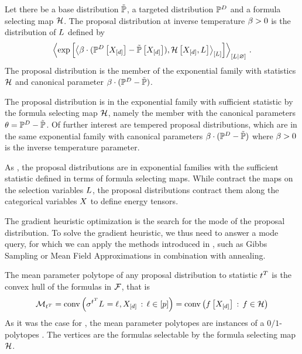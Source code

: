 \begin{definition}
    Let there be a base distribution $\tilde{\mathbb{P}}$, a targeted distribution $\mathbb{P}^{D}$ and a formula selecting map $\mathcal{H}$.
    The proposal distribution at inverse temperature $\beta>0$ is the distribution of $L$ defined by
    \begin{align*}
        \left\langle \mathrm{exp}\left[\left\langle \beta\cdot(\mathbb{P}^{D}\left[X_{[d]}\right]-\tilde{\mathbb{P}}\left[X_{[d]}\right]),\mathcal{H}\left[X_{[d]},L\right]\right\rangle_{\left[ L \right]}\right] \right\rangle_{\left[ L | \varnothing \right]} \, .
    \end{align*}
    The proposal distribution is the member of the exponential family with statistics $\mathcal{H}$ and canonical parameter $\beta\cdot(\mathbb{P}^{D}-\tilde{\mathbb{P}})$.
\end{definition}


The proposal distribution is in the exponential family with sufficient statistic by the formula selecting map $\mathcal{H}$, namely the member with the canonical parameters $\theta=\mathbb{P}^{D}-\tilde{\mathbb{P}}$.
Of further interest are tempered proposal distributions, which are in the same exponential family with canonical parameters $\beta\cdot(\mathbb{P}^{D}-\tilde{\mathbb{P}})$ where $\beta>0$ is the inverse temperature parameter.

As \MarkovLogicNetworks{}, the proposal distributions are in exponential families with the sufficient statistic defined in terms of formula selecting maps.
While \MarkovLogicNetworks{} contract the maps on the selection variables $L$, the proposal distributions contract them along the categorical variables $X$ to define energy tensors.

The gradient heuristic optimization  is the search for the mode of the proposal distribution.
To solve the gradient heuristic, we thus need to answer a mode query, for which we can apply the methods introduced in , such as Gibbs Sampling or Mean Field Approximations in combination with annealing.


The mean parameter polytope of any proposal distribution to statistic $t^T$ is the convex hull of the formulas in $\mathcal{F}$, that is
\begin{align*}
    \mathcal{M}_{t^T}
    = \mathrm{conv}\left(\sigma^{t^T}{L_{}=\ell_{},X_{[d]}} \,:\, \ell\in[p]\right)
    = \mathrm{conv}\left(f\left[X_{[d]}\right] \,:\, f\in\mathcal{H}\right)
\end{align*}
As it was the case for \MarkovLogicNetworks{}, the mean parameter polytopes are instances of a $0/1$-polytopes \cite{ziegler_lectures_2000,gillmann_01-polytopes_2007}.
The vertices are the formulas selectable by the formula selecting map $\mathcal{H}$.

